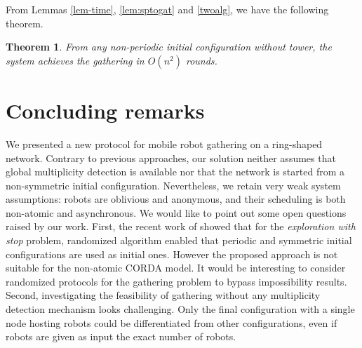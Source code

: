 \documentclass[11pt]{article}
\newtheorem{theorem}{Theorem}
\begin{document}
From Lemmas \ref{lem-time}, \ref{lem:sptogat} and \ref{twoalg}, we have the following theorem.

\begin{theorem}
From any non-periodic initial configuration without tower, the system achieves the gathering in $O(n^2)$ rounds.
\end{theorem}

\section{Concluding remarks}

We presented a new protocol for mobile robot gathering on a ring-shaped network. Contrary to previous approaches, our solution neither assumes that global multiplicity detection is available nor that the network is started from a non-symmetric initial configuration. Nevertheless, we retain very weak system assumptions: robots are oblivious and anonymous, and their scheduling is both non-atomic and asynchronous. We would like to point out some open questions raised by our work.
First, the recent work of \cite{Devismes09} showed that for the \emph{exploration with stop} problem, randomized algorithm enabled that periodic and symmetric initial configurations are used as initial ones. However the proposed approach is not suitable for the non-atomic CORDA model. It would be interesting to consider randomized protocols for the gathering problem to bypass impossibility results.
Second, investigating the feasibility of gathering without any multiplicity detection mechanism looks challenging. Only the final configuration with a single node hosting robots could be differentiated from other configurations, even if robots are given as input the exact number of robots.



 
\end{document}
